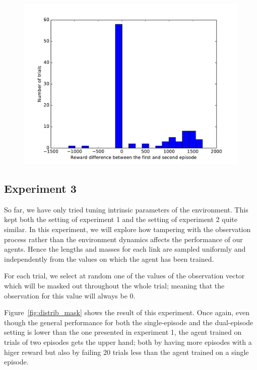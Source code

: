 \documentclass[letterpaper]{article}
\begin{document}
\begin{figure}[h]
	\centering
	\includegraphics[width=\linewidth]{fig/reward_diff_cunseen.pdf}
	\caption{}
	\label{fig:reward_diff_cunseen}
\end{figure}

\subsection{Experiment 3}
So far, we have only tried tuning intrinsic parameters of the environment. This
kept both the setting of experiment 1 and the setting of experiment 2 quite
similar. In this experiment, we will explore how tampering with the
observation process rather than the environment dynamics affects the performance
of our agents. Hence the lengths and masses for each link are sampled 
uniformly and independently from the values on which the agent has been trained.

For each trial, we select at random one of the values of the observation vector
which will be masked out throughout the whole trial; meaning that the
observation for this value will always be 0. 

Figure~\ref{fig:distrib_mask} shows the result of this experiment. Once again,
even though the general performance for both the single-episode and the
dual-episode setting is lower than the one presented in experiment 1, the
agent trained on trials of two episodes gets the upper hand; both by
having more episodes with a higer reward but also by failing 20 trials less
than the agent trained on a single episode.
\end{document}
